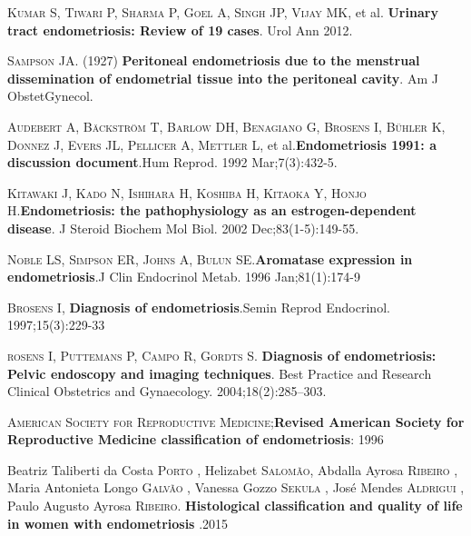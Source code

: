 \documentclass[12pt]{article} %
\begin{document}
\vspace{0,5cm}

\textsc{Kumar S, Tiwari P, Sharma P, Goel A, Singh JP, Vijay MK}, et al.\textbf{ Urinary tract endometriosis: Review of 19 cases}. Urol Ann 2012.

\vspace{0,5cm}

\textsc{Sampson JA}. (1927) \textbf{Peritoneal endometriosis due to the
menstrual dissemination of endometrial tissue into the
peritoneal cavity}. Am J ObstetGynecol.

\vspace{0,5cm}


\textsc{Audebert A, Bäckström T, Barlow DH, Benagiano G, Brosens I, Bühler K, Donnez J, Evers JL, Pellicer A, Mettler L}, et al.\textbf{Endometriosis 1991: a discussion document}.Hum Reprod. 1992 Mar;7(3):432-5.

\vspace{0,5cm}

\textsc{Kitawaki J, Kado N, Ishihara H, Koshiba H, Kitaoka Y, Honjo H}.\textbf{Endometriosis: the pathophysiology as an estrogen-dependent disease}. J Steroid Biochem Mol Biol. 2002 Dec;83(1-5):149-55.

\vspace{0,5cm}

\textsc{Noble LS, Simpson ER, Johns A, Bulun SE}.\textbf{Aromatase expression in endometriosis}.J Clin Endocrinol Metab. 1996 Jan;81(1):174-9

\vspace{0,5cm}

\textsc{Brosens I}, \textbf{Diagnosis of endometriosis}.Semin Reprod Endocrinol. 1997;15(3):229-33

\vspace{0,5cm}

\textsc{rosens I, Puttemans P, Campo R, Gordts S}. \textbf{Diagnosis of endometriosis: Pelvic endoscopy and imaging techniques}. Best Practice and Research Clinical Obstetrics and Gynaecology. 2004;18(2):285–303.

\vspace{0,5cm}

\textsc{American Society for Reproductive Medicine};\textbf{Revised American Society for Reproductive Medicine classification of endometriosis}: 1996

\vspace{0,5cm}

Beatriz Taliberti da Costa \textsc{Porto} , Helizabet \textsc{Salomão}, Abdalla Ayrosa \textsc{Ribeiro} , Maria Antonieta Longo \textsc{Galvão} , Vanessa Gozzo \textsc{Sekula} , José Mendes \textsc{Aldrigui} , Paulo Augusto Ayrosa \textsc{Ribeiro}.
\textbf{Histological classification and quality of life in women with endometriosis} .2015
\end{document}
